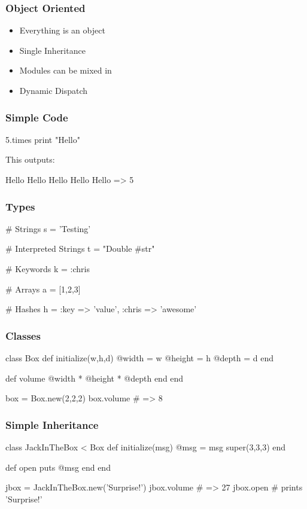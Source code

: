 \begin{frame}
  \frametitle{Object Oriented}
  \begin{itemize}
  \item Everything is an object
  \pause
  \item Single Inheritance
  \pause
  \item Modules can be mixed in
  \pause
  \item Dynamic Dispatch
  \end{itemize}
\end{frame}

\begin{frame}[fragile]
  \frametitle{Simple Code}
  \begin{rubycode}
    5.times { print "Hello" }
  \end{rubycode}
  \pause
  This outputs:
  \begin{console}
    Hello
    Hello
    Hello
    Hello
    Hello
    => 5
  \end{console}
\end{frame}

\begin{frame}[fragile]
  \frametitle{Types}
  \begin{rubycode}
    # Strings
    s = 'Testing'

    # Interpreted Strings
    t = "Double #{str}"

    # Keywords
    k = :chris

    # Arrays
    a = [1,2,3]

    # Hashes
    h = { :key => 'value', :chris => 'awesome' }
  \end{rubycode}
\end{frame}

\begin{frame}[fragile]
  \frametitle{Classes}
  \begin{rubycode}
    class Box
      def initialize(w,h,d)
        @width = w
        @height = h
        @depth = d
      end

      def volume
        @width * @height * @depth
      end
    end

    box = Box.new(2,2,2)
    box.volume # => 8
  \end{rubycode}
\end{frame}

\begin{frame}[fragile]
  \frametitle{Simple Inheritance}
  \begin{rubycode}
    class JackInTheBox < Box
      def initialize(msg)
        @msg = msg
        super(3,3,3)
      end

      def open
        puts @msg
      end
    end

    jbox = JackInTheBox.new('Surprise!')
    jbox.volume # => 27
    jbox.open # prints 'Surprise!'
  \end{rubycode}
\end{frame}


